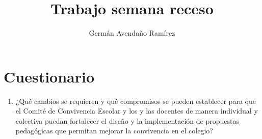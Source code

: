 \documentclass[11pt,letterpaper]{article}
\author{Germán Avendaño Ramírez}
\title{Trabajo semana receso}
\begin{document}
\maketitle
\section*{Cuestionario}
\begin{enumerate}
\item ¿Qué cambios se requieren y qué compromisos se pueden establecer para que el Comité de Convivencia Escolar y los y las docentes de manera individual y colectiva puedan fortalecer el diseño y la implementación de propuestas pedagógicas que permitan mejorar la convivencia en el colegio?


\end{enumerate}
\end{document}
